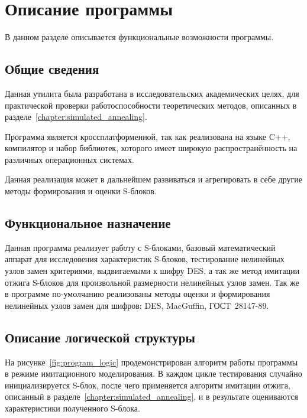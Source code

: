 \chapter{Описание программы}
\label{chapter:program}

В данном разделе описывается функциональные возможности программы.

\section{Общие сведения}

Данная утилита была разработана в исследовательских академических целях, для
практической проверки работоспособности теоретических методов, описанных в
разделе~\ref{chapter:simulated_annealing}.

Программа является кроссплатформенной, так как реализована на языке C++,
компилятор и набор библиотек, которого имеет широкую распространённость на
различных операционных системах.

Данная реализация может в дальнейшем развиваться и агрегировать в себе другие
методы формирования и оценки S-блоков.

\section{Функциональное назначение}

Данная программа реализует работу с S-блоками, базовый математический аппарат
для исследовения характеристик S-блоков, тестирование нелинейных узлов замен
критериями, выдвигаемыми к шифру DES, а так же метод имитации отжига S-блоков
для произвольной размерности нелинейных узлов замен. Так же в программе
по-умолчанию реализованы методы оценки и формирования нелинейных узлов замен для
шифров: DES, MacGuffin, ГОСТ~28147-89.

\section{Описание логической структуры}

На рисунке~\ref{fig:program_logic} продемонстрирован алгоритм работы программы в
режиме имитационного моделирования. В каждом цикле тестирования случайно
инициализируется S-блок, после чего применяется алгоритм имитации отжига,
описанный в разделе~\ref{chapter:simulated_annealing}, и в результате
оцениваются характеристики полученного S-блока.

